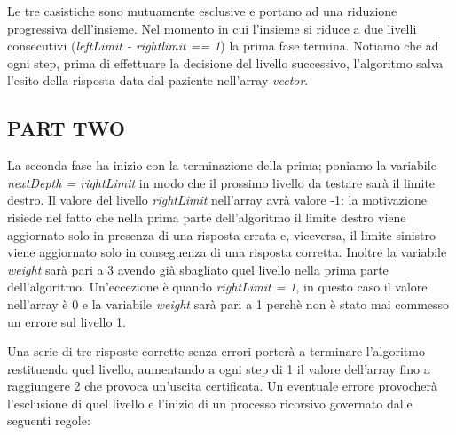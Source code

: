 \documentclass[
	corpo=12pt,
	twoside,
 	evenboxes,
	tipotesi=triennale,
    	stile=classica,
   	 greek,
]{toptesi}
\begin{document}
Le tre casistiche sono mutuamente esclusive e portano ad una riduzione progressiva dell'insieme. Nel momento in cui l'insieme si riduce a due livelli consecutivi (\textit{leftLimit - rightlimit == 1}) la prima fase termina. Notiamo che ad ogni step, prima di effettuare la decisione del livello successivo, l'algoritmo salva l'esito della risposta data dal paziente nell'array \textit{vector}.

\subsection{PART TWO}
\label{subsec:part two}

La seconda fase ha inizio con la terminazione della prima; poniamo la variabile \textit{nextDepth = rightLimit} in modo che il prossimo livello da testare sarà il limite destro. Il valore del livello \textit{rightLimit} nell'array avrà valore -1:  la motivazione risiede nel fatto che nella prima parte dell'algoritmo il limite destro viene aggiornato solo in presenza di una risposta errata e, viceversa, il limite sinistro viene aggiornato solo in conseguenza di una risposta corretta. Inoltre la variabile \textit{weight} sarà pari a 3 avendo già sbagliato quel livello nella prima parte dell'algoritmo. Un'eccezione è quando \textit{rightLimit = 1}, in questo caso il valore nell'array è 0 e la variabile \textit{weight} sarà pari a 1 perchè non è stato mai commesso un errore sul livello 1.

Una serie di tre risposte corrette senza errori porterà a terminare l’algoritmo restituendo quel livello, aumentando a ogni step di 1 il valore dell'array fino a raggiungere 2 che provoca un'uscita certificata. Un eventuale errore provocherà l’esclusione di quel livello e l'inizio di un processo ricorsivo governato dalle seguenti regole:
\end{document}
